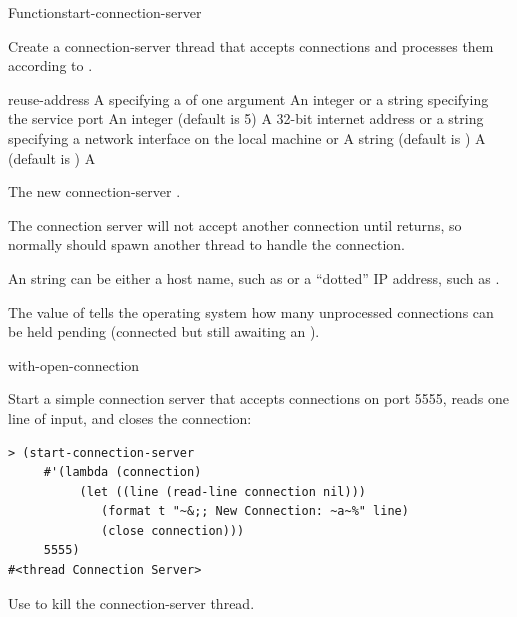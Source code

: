 \documentclass[10pt,twoside,english,pdftex]{article}
\begin{document}
\begin{functiondoc}{Function}{start-connection-server}%
  {
     
    \returns{} }
%
%
%
%

\fnsyntax

\fnpurpose Create a connection-server thread that accepts connections
and processes them according to .

\fnpackage {}

\fnmodule {}

\fnargs
\begin{args}{reuse-address}
\arg[function] A  specifying a 
   of one argument
\arg[port] An integer or a string specifying the service port
\arg[backlog] An integer (default is 5)
\arg[interface] A 32-bit internet address or a string specifying a network 
interface on the local machine or \nil 
\arg[name] A string (default is )
 A  (default is \nil)
\arg[thread] A 
\end{args}

\fnreturns The new connection-server .

\fnerrors
\nothreads{}

%
\fndescription The connection server will not accept another
connection until  returns, so normally
 should spawn another thread to handle the
connection.  

An  string can be either a host name, such as
 or a ``dotted'' IP address, such as
.

The value of  tells the operating system
how many unprocessed connections can be held pending (connected but
still awaiting an ).

\begin{alsos}{with-open-connection}
\end{alsos}

\fnexample
Start a simple connection server that accepts connections on port
5555, reads one line of input, and closes the connection:
%
\W\supp
\begin{verbatim}
> (start-connection-server
     #'(lambda (connection)
          (let ((line (read-line connection nil)))
             (format t "~&;; New Connection: ~a~%" line)
             (close connection)))
     5555)
#<thread Connection Server>
\end{verbatim}

%
\fnnote Use  to kill the
connection-server thread.

\end{functiondoc}
\end{document}
